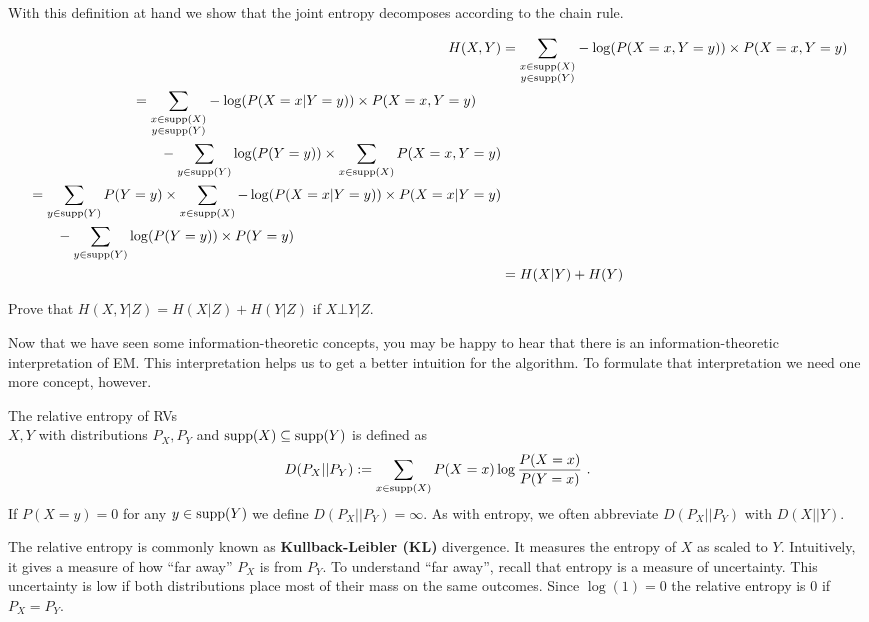 With this definition at hand we show that the joint entropy decomposes according to the
chain rule.

\begin{align*}
H(X,Y) &= \underset{\substack{x \in \operatorname{supp}(X)\\y \in \operatorname{supp}(Y)}}{\sum} -\log(P(X=x,Y=y)) \times P(X=x, Y=y) \\
\begin{split}
&= \underset{\substack{x \in \operatorname{supp}(X)\\ y \in \operatorname{supp}(Y)}}{\sum} -\log(P(X=x| Y=y)) \times P(X=x,Y=y) \\ 
&\qquad - \underset{y \in \operatorname{supp}(Y)}{\sum}\log(P(Y=y)) \times \sum_{x \in \operatorname{supp}(X)} P(X=x,Y=y) 
\end{split} \\
\begin{split}
&=\sum_{y \in \operatorname{supp}(Y)} P(Y=y) \times \sum_{x \in \operatorname{supp}(X)} -\log(P(X=x| Y=y)) \times P(X=x|Y=y) \\ &\qquad - \underset{y \in \operatorname{supp}(Y)}{\sum}\log(P(Y=y)) \times P(Y=y)
\end{split} \\
&= H(X|Y) + H(Y)
\end{align*}

\begin{Exercise}
Prove that $ H(X,Y|Z) = H(X|Z) + H(Y|Z) $ if $ X \bot Y|Z $.
\end{Exercise}

Now that we have seen some information-theoretic concepts, you may be happy to hear that there is an information-theoretic interpretation
of EM. This interpretation helps us to get a better intuition for the algorithm. To formulate that interpretation we need
one more concept, however.

\begin{Definition}
The relative entropy of RVs \\ $ X,Y $ with distributions $P_X, P_Y$ and $\operatorname{supp}(X) \subseteq \operatorname{supp}(Y) $ is defined as
$$ D(P_X||P_Y) := \sum_{x \in \operatorname{supp}(X)} P(X=x) \log \frac{P(X=x)}{P(Y=x)} \ . $$
If $ P(X=y) = 0 $ for any $ y \in \operatorname{supp}(Y) $ we define $ D(P_X||P_Y) = \infty $. As with entropy, we often abbreviate $D(P_X||P_Y)$ with  $D(X||Y)$.
\end{Definition}

The relative entropy is commonly known as \textbf{Kullback-Leibler (KL)} divergence. It measures the entropy of $ X $ as scaled to $ Y $. Intuitively,
it gives a measure of how ``far away'' $ P_{X} $ is from $ P_{Y} $. To
understand ``far away'', recall that entropy is a measure of
uncertainty. 
This uncertainty is low if both distributions place most
of their mass on the same outcomes. Since $ \log(1) = 0 $ the relative entropy is 0 if $ P_{X} = P_{Y} $.

